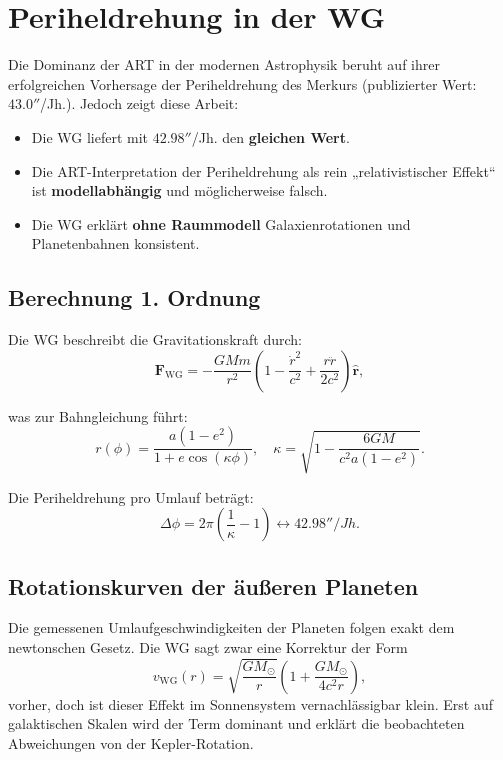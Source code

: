 \section{Periheldrehung in der WG}
Die Dominanz der ART in der modernen Astrophysik beruht auf ihrer erfolgreichen Vorhersage der Periheldrehung des Merkurs \cite{einstein1915} (publizierter Wert: $43.0''$/Jh.). Jedoch zeigt diese Arbeit:
\begin{itemize}
    \item Die WG liefert mit $42.98''$/Jh. den \textbf{gleichen Wert}.
    \item Die ART-Interpretation der Periheldrehung als rein „relativistischer Effekt“ ist \textbf{modellabhängig} und möglicherweise falsch.
    \item Die WG erklärt \textbf{ohne Raummodell} Galaxienrotationen und Planetenbahnen konsistent.
\end{itemize}

\subsection{Berechnung 1. Ordnung}
Die WG beschreibt die Gravitationskraft durch:
\begin{equation}
\mathbf{F}_{\text{WG}} = -\frac{GMm}{r^2}\left(1 - \frac{\dot{r}^2}{c^2} + \frac{r\ddot{r}}{2c^2}\right)\hat{\mathbf{r}},
\end{equation}

was zur Bahngleichung führt:
\begin{equation}
r(\phi) = \frac{a(1-e^2)}{1 + e \cos\left(\kappa \phi\right)}, \quad \kappa = \sqrt{1 - \frac{6GM}{c^2 a (1-e^2)}}.
\end{equation}

Die Periheldrehung pro Umlauf beträgt:
\begin{equation}
\Delta\phi = 2\pi\left(\frac{1}{\kappa} - 1\right) \leftrightarrow 42.98'' /Jh.
\end{equation}

\subsection{Rotationskurven der äußeren Planeten}
Die gemessenen Umlaufgeschwindigkeiten der Planeten folgen exakt dem newtonschen Gesetz. Die WG sagt zwar eine Korrektur der Form
\[
v_{\text{WG}}(r) = \sqrt{\frac{GM_\odot}{r}} \left(1 + \frac{GM_\odot}{4c^2 r}\right),
\]
vorher, doch ist dieser Effekt im Sonnensystem vernachlässigbar klein. Erst auf galaktischen Skalen wird der Term dominant und
erklärt die beobachteten Abweichungen von der Kepler-Rotation.
